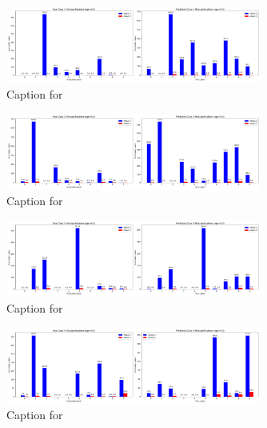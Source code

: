 \documentclass{article}
\begin{document}
\begin{figure}[!htbp]
\centering
\includegraphics[width=0.75\textwidth]{combined_class_boundary_pgd/combined_class_1_misclassifications_eps_0.4.png}
\caption{Caption for }
\label{fig:combined_class_1_misclassifications_eps_0.4.png}
\end{figure}

\begin{figure}[!htbp]
\centering
\includegraphics[width=0.75\textwidth]{combined_class_boundary_pgd/combined_class_2_misclassifications_eps_0.4.png}
\caption{Caption for }
\label{fig:combined_class_2_misclassifications_eps_0.4.png}
\end{figure}

\begin{figure}[!htbp]
\centering
\includegraphics[width=0.75\textwidth]{combined_class_boundary_pgd/combined_class_3_misclassifications_eps_0.4.png}
\caption{Caption for }
\label{fig:combined_class_3_misclassifications_eps_0.4.png}
\end{figure}

\begin{figure}[!htbp]
\centering
\includegraphics[width=0.75\textwidth]{combined_class_boundary_pgd/combined_class_4_misclassifications_eps_0.4.png}
\caption{Caption for }
\label{fig:combined_class_4_misclassifications_eps_0.4.png}
\end{figure}
\end{document}
